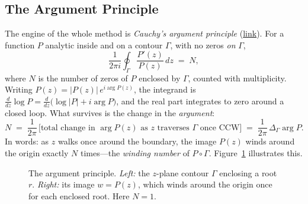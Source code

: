 \documentclass[11pt]{article}
\begin{document}
\subsection{The Argument Principle}
\label{sec:argprinciple}
The engine of the whole method is \emph{Cauchy's argument principle}
(\href{https://en.wikipedia.org/wiki/Argument_principle}{link}). For a function
$P$ analytic inside and on a contour $\Gamma$, with no zeros \emph{on} $\Gamma$,
\begin{equation}
  \frac{1}{2\pi i}\oint_{\Gamma} \frac{P'(z)}{P(z)}\,dz
  \;=\; N,
  \label{eq:argprinciple}
\end{equation}
where $N$ is the number of zeros of $P$ enclosed by $\Gamma$, counted with
multiplicity. Writing $P(z) = |P(z)|\,e^{i\arg P(z)}$, the integrand is
$\tfrac{d}{dz}\log P = \tfrac{d}{dz}\big(\log|P| + i\arg P\big)$, and the real
part integrates to zero around a closed loop. What survives is the change in the
\emph{argument}:
\begin{equation}
  N \;=\; \frac{1}{2\pi}\,\big[\text{total change in } \arg P(z)
          \text{ as } z \text{ traverses } \Gamma \text{ once CCW}\big]
      \;=\; \frac{1}{2\pi}\,\Delta_\Gamma \arg P.
  \label{eq:winding}
\end{equation}
In words: as $z$ walks once around the boundary, the image $P(z)$ winds around
the origin exactly $N$ times---the \emph{winding number} of $P\circ\Gamma$.
Figure~\ref{fig:argprinciple} illustrates this.

\begin{figure}[h]
\centering
{}
\caption{The argument principle. \emph{Left:} the $z$-plane contour $\Gamma$
enclosing a root $r$. \emph{Right:} its image $w=P(z)$, which winds around the
origin once for each enclosed root. Here $N=1$.}
\label{fig:argprinciple}
\end{figure}
\end{document}
